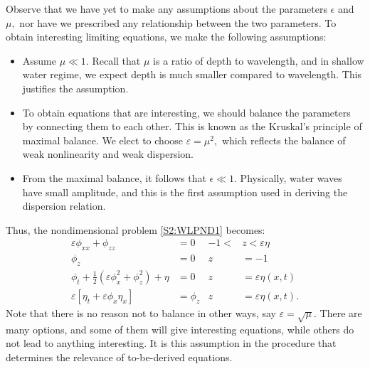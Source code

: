 \documentclass[11pt,reqno,oneside,a4paper]{article}
\begin{document}
Observe that we have yet to make any assumptions about the parameters $\epsilon$ and $\mu,$ nor have we prescribed any relationship between the two parameters. To obtain interesting limiting equations, we make the following assumptions:
\begin{itemize}
\item Assume $\mu \ll 1.$ Recall that $\mu$ is a ratio of depth to wavelength, and in shallow water regime, we expect depth is much smaller compared to wavelength. This justifies the assumption.
\item To obtain equations that are interesting, we should balance the parameters by connecting them to each other. This is known as the Kruskal's principle of maximal balance. We elect to choose $\varepsilon = \mu^2,$ which reflects the balance of weak nonlinearity and weak dispersion.
\item From the maximal balance, it follows that $\epsilon \ll 1.$ Physically, water waves have small amplitude, and this is the first assumption used in deriving the dispersion relation.
\end{itemize}
Thus, the nondimensional problem \eqref{S2:WLPND1} becomes:
\begin{subequations}\label{S2:WLPND2}
\begin{align}
\label{S2:PDEND2}  \varepsilon\phi_{xx} + \phi_{zz} &= 0 &-1 <&z < \varepsilon\eta \\
\label{S2:BC1ND2} \phi_z &= 0 &z &= -1  \\ 
\label{S2:BC2ND2} \phi_{t} + \frac{1}{2} \left(\varepsilon\phi_{x}^2 + \phi_{z}^2\right) + \eta &= 0 &z &= \varepsilon\eta(x,t)\\
\label{S2:BC3ND2} \varepsilon\left[\eta_{t} + \varepsilon \phi_{x} \eta_{x}\right] &= \phi_{z} &z &= \varepsilon\eta(x,t).
\end{align}
\end{subequations}
Note that there is no reason not to balance in other ways, say $\varepsilon = \sqrt{\mu}.$ There are many options, and some of them will give interesting equations, while others do not lead to anything interesting. It is this assumption in the procedure that determines the relevance of to-be-derived equations.
\end{document}
